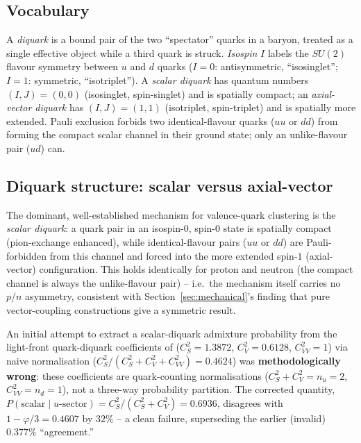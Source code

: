 \documentclass[11pt]{article}
\begin{document}
\subsection{Vocabulary}
A \emph{diquark} is a bound pair of the two ``spectator'' quarks in a baryon, treated as a single effective object while a third quark is struck. \emph{Isospin} $I$ labels the $SU(2)$ flavour symmetry between $u$ and $d$ quarks ($I=0$: antisymmetric, ``isosinglet''; $I=1$: symmetric, ``isotriplet''). A \emph{scalar diquark} has quantum numbers $(I,J)=(0,0)$ (isosinglet, spin-singlet) and is spatially compact; an \emph{axial-vector diquark} has $(I,J)=(1,1)$ (isotriplet, spin-triplet) and is spatially more extended. Pauli exclusion forbids two identical-flavour quarks ($uu$ or $dd$) from forming the compact scalar channel in their ground state; only an unlike-flavour pair ($ud$) can.

\subsection{Diquark structure: scalar versus axial-vector}
The dominant, well-established mechanism for valence-quark clustering is the \emph{scalar diquark}: a quark pair in an isospin-$0$, spin-$0$ state is spatially compact (pion-exchange enhanced), while identical-flavour pairs ($uu$ or $dd$) are Pauli-forbidden from this channel and forced into the more extended spin-$1$ (axial-vector) configuration. This holds identically for proton and neutron (the compact channel is always the unlike-flavour pair) -- i.e.\ the mechanism itself carries no $p/n$ asymmetry, consistent with Section~\ref{sec:mechanical}'s finding that pure vector-coupling constructions give a symmetric result.

\begin{negativebox}
An initial attempt to extract a scalar-diquark admixture probability from the light-front quark-diquark coefficients of \citep{Maji2016} ($C_S^2=1.3872$, $C_V^2=0.6128$, $C_{VV}^2=1$) via naive normalisation ($C_S^2/(C_S^2+C_V^2+C_{VV}^2)=0.4624$) was \textbf{methodologically wrong}: these coefficients are quark-counting normalisations ($C_S^2+C_V^2=n_u=2$, $C_{VV}^2=n_d=1$), not a three-way probability partition. The corrected quantity, $P(\text{scalar}\mid u\text{-sector})=C_S^2/(C_S^2+C_V^2)=0.6936$, disagrees with $1-\varphi/3=0.4607$ by $32\%$ -- a clean failure, superseding the earlier (invalid) $0.377\%$ ``agreement.''
\end{negativebox}
\end{document}
